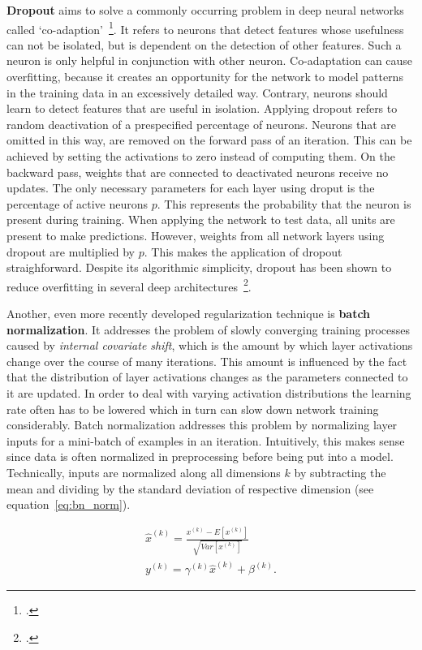 \textbf{Dropout} aims to solve a commonly occurring problem in deep neural networks
called `co-adaption'~\footcite{Hinton2012a}.
It refers to neurons that detect features whose usefulness can not be isolated,
but is dependent on the detection of other features.
Such a neuron is only helpful in conjunction with other neuron.
Co-adaptation can cause overfitting, because it creates an opportunity for
the network to model patterns in the training data in an excessively detailed
way.
Contrary, neurons should learn to detect features that are useful in isolation.
Applying dropout refers to random deactivation of a prespecified percentage
of neurons.
Neurons that are omitted in this way, are removed on the forward pass of an
iteration.
This can be achieved by setting the activations to zero instead of computing
them.
On the backward pass, weights that are connected to deactivated neurons receive
no updates.
The only necessary parameters for each layer using droput is the percentage
of active neurons $p$.
This represents the probability that the neuron is present during training.
When applying the network to test data, all units are present to make predictions.
However, weights from all network layers using dropout are multiplied by $p$.
This makes the application of dropout straighforward.
Despite its algorithmic simplicity, dropout has been shown to reduce overfitting
in several deep architectures~\footcite{Srivastava2014}.

Another, even more recently developed regularization technique is \textbf{batch
normalization}.
It addresses the problem of slowly converging training processes caused by
\textit{internal covariate shift}, which is the amount by which layer activations
change over the course of many iterations.
This amount is influenced by the fact that the distribution of layer activations changes
as the parameters connected to it are updated.
In order to deal with varying activation distributions the learning rate often
has to be lowered which in turn can slow down network training considerably.
Batch normalization addresses this problem by normalizing layer inputs for
a mini-batch of examples in an iteration.
Intuitively, this makes sense since data is often normalized in preprocessing
before being put into a model.
Technically, inputs are normalized along all dimensions $k$ by subtracting the mean
and dividing by the standard deviation of respective dimension (see equation~\ref{eq:bn_norm}).

\begin{align}
  \widehat{x}^{(k)} = \frac{x^{(k)} - E[x^{(k)}]}{\sqrt{Var[x^{(k)}]}} \label{eq:bn_norm} \\
  y^{(k)} = \gamma^{(k)} \widehat{x}^{(k)} + \beta^{(k)} \label{eq:bn_scale_shift}.
\end{align}

